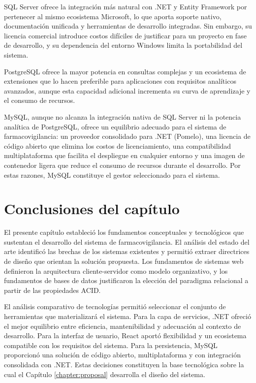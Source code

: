 SQL Server ofrece la integración más natural con .NET y Entity Framework por pertenecer al mismo ecosistema Microsoft, lo que aporta soporte nativo, documentación unificada y herramientas de desarrollo integradas. 
Sin embargo, su licencia comercial introduce costos difíciles de justificar para un proyecto en fase de desarrollo, y su dependencia del entorno Windows limita la portabilidad del sistema. 

PostgreSQL ofrece la mayor potencia en consultas complejas y un ecosistema de extensiones que lo hacen preferible para aplicaciones con requisitos analíticos avanzados, aunque esta capacidad adicional incrementa su curva de aprendizaje y el consumo de recursos. 

MySQL, aunque no alcanza la integración nativa de SQL Server ni la potencia analítica de PostgreSQL, ofrece un equilibrio adecuado para el sistema de farmacovigilancia: un proveedor consolidado para .NET (Pomelo), una licencia de código abierto que elimina los costos de licenciamiento, una compatibilidad multiplataforma que facilita el despliegue en cualquier entorno y una imagen de contenedor ligera que reduce el consumo de recursos durante el desarrollo. 
Por estas razones, MySQL constituye el gestor seleccionado para el sistema.





\section{Conclusiones del capítulo}
\label{section:conclusiones_estado_arte}

El presente capítulo estableció los fundamentos conceptuales y tecnológicos que sustentan el desarrollo del sistema de farmacovigilancia. El análisis del estado del arte identificó las brechas de los sistemas existentes y permitió extraer directrices de diseño que orientan la solución propuesta. Los fundamentos de sistemas web definieron la arquitectura cliente-servidor como modelo organizativo, y los fundamentos de bases de datos justificaron la elección del paradigma relacional a partir de las propiedades ACID.

El análisis comparativo de tecnologías permitió seleccionar el conjunto de herramientas que materializará el sistema. Para la capa de servicios, .NET ofreció el mejor equilibrio entre eficiencia, mantenibilidad y adecuación al contexto de desarrollo. Para la interfaz de usuario, React aportó flexibilidad y un ecosistema compatible con los requisitos del sistema. Para la persistencia, MySQL proporcionó una solución de código abierto, multiplataforma y con integración consolidada con .NET. Estas decisiones constituyen la base tecnológica sobre la cual el Capítulo \ref{chapter:proposal} desarrolla el diseño del sistema.